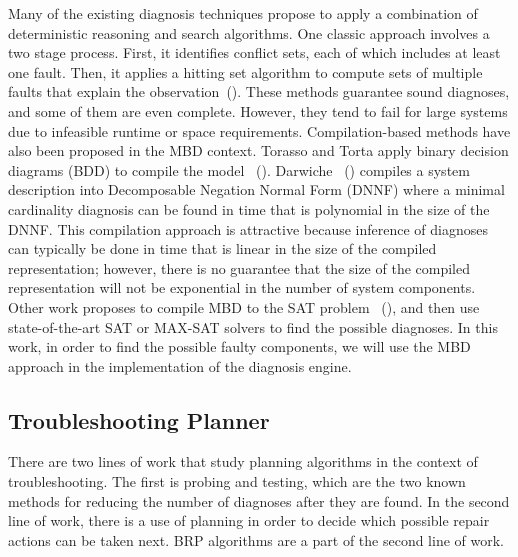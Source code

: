 \documentclass[review]{elsarticle}
\begin{document}
Many of the existing diagnosis techniques propose to apply a combination of deterministic reasoning and search algorithms. One classic approach involves a two stage process. First, it identifies conflict sets, each of which includes at least one fault. Then, it applies a hitting set algorithm to compute sets of multiple faults that explain the observation~(\cite{de1987diagnosing,williams2007conflict}). These methods guarantee sound diagnoses, and some of them are even complete. However, they tend to fail for large systems due to infeasible runtime or space requirements.
Compilation-based methods have also been proposed in the MBD context. Torasso and Torta apply binary decision diagrams (BDD) to compile the model ~(\cite{torasso2006model}). Darwiche ~(\cite{darwiche2001decomposable}) compiles a system description into Decomposable Negation Normal Form (DNNF) where a minimal cardinality diagnosis can be found in time that is polynomial in the size of the DNNF. This compilation approach is attractive because inference of diagnoses can typically be done in time that is linear in the size of the compiled representation; however, there is no guarantee that the size of the compiled representation will not be exponential in the number of system components. Other work proposes to compile MBD to the SAT problem ~(\cite{metodi2012compiling}), and then use state-of-the-art SAT or MAX-SAT solvers to find the possible diagnoses. 
In this work, in order to find the possible faulty components, we will use the MBD approach in the implementation of the diagnosis engine.  

\subsection{Troubleshooting Planner}
There are two lines of work that study planning algorithms in the context of troubleshooting. The first is probing and testing, which are the two known methods for reducing the number of diagnoses after they are found. In the second line of work, there is a use of planning in order to decide which possible repair actions can be taken next. BRP algorithms are a part of the second line of work. 
\end{document}
